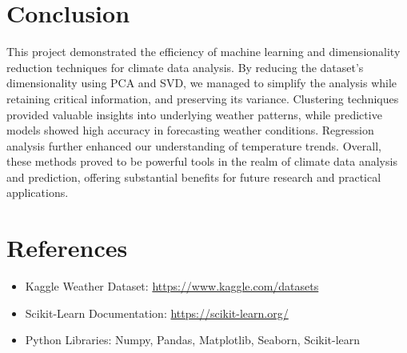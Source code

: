 \documentclass[12pt]{article}
\begin{document}
\section{Conclusion}
This project demonstrated the efficiency of machine learning and dimensionality reduction techniques for climate data analysis. By reducing the dataset’s dimensionality using PCA and SVD, we managed to simplify the analysis while retaining critical information, and preserving its variance.
Clustering techniques provided valuable insights into underlying weather patterns, while predictive models showed high accuracy in forecasting weather conditions. Regression analysis further enhanced our understanding of temperature trends. Overall, these methods proved to be powerful tools in the realm of climate data analysis and prediction, offering substantial benefits for future research and practical applications.

\section*{References}
\begin{itemize}
    \item Kaggle Weather Dataset: \url{https://www.kaggle.com/datasets}
    \item Scikit-Learn Documentation: \url{https://scikit-learn.org/}
    \item Python Libraries: Numpy, Pandas, Matplotlib, Seaborn, Scikit-learn
\end{itemize}

\appendix
\end{document}
